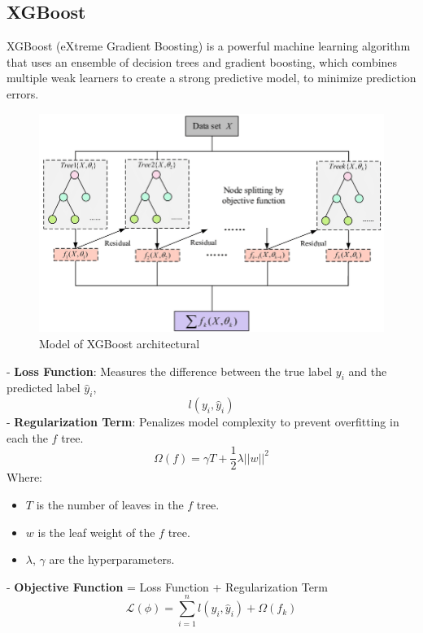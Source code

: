 \documentclass{ieeeojies}
\begin{document}
\subsection{XGBoost}
XGBoost (eXtreme Gradient Boosting) is a powerful machine learning algorithm that uses an ensemble of decision trees and gradient boosting, which combines multiple weak learners to create a strong predictive model, to minimize prediction errors.\\
\begin{figure} [H]
    \centering
    \includegraphics[width=0.8\linewidth]{./image/XGBoost.png}
    \caption{Model of XGBoost architectural}
    \label{fig:10}
\end{figure}
\noindent
- \textbf{Loss Function}: Measures the difference between the true label \(y_i\) and the predicted label \(\hat{y}_i\),\\
\begin{dmath*}
    l(y_i, \hat{y}_i)
\end{dmath*}
- \textbf{Regularization Term}: Penalizes model complexity to prevent overfitting in each the \(f\) tree.\\
\begin{dmath*}
    \Omega(f) = \gamma T + \frac{1}{2} \lambda ||w||^2
\end{dmath*}
Where:
\begin{itemize}
    \item \(T\) is the number of leaves in the \(f\) tree.
    \item \(w\) is the leaf weight of the \(f\) tree.
    \item \(\lambda\), \(\gamma\)  are the  hyperparameters.
\end{itemize}
- \textbf{Objective Function} = Loss Function + Regularization Term
\begin{dmath*}
    \mathcal{L}(\phi) = \sum_{i=1}^n l(y_i, \hat{y}_i) + \Omega(f_k)
\end{dmath*}
\end{document}
